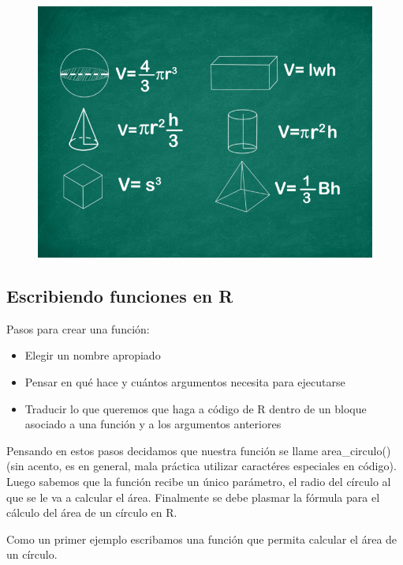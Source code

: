 \documentclass[]{book}
\providecommand{\tightlist}{%
  \setlength{\itemsep}{0pt}\setlength{\parskip}{0pt}}
\theoremstyle{definition}
\theoremstyle{definition}
\theoremstyle{definition}
\theoremstyle{remark}
\begin{document}
\begin{figure}
\centering
\includegraphics{./imagenes/volume.png}
\caption{}
\end{figure}

\subsection{Escribiendo funciones en
R}\label{escribiendo-funciones-en-r}

Pasos para crear una función:

\begin{itemize}
\tightlist
\item
  Elegir un nombre apropiado
\item
  Pensar en qué hace y cuántos argumentos necesita para ejecutarse
\item
  Traducir lo que queremos que haga a código de R dentro de un bloque
  asociado a una función y a los argumentos anteriores
\end{itemize}

Pensando en estos pasos decidamos que nuestra función se llame
area\_circulo() (sin acento, es en general, mala práctica utilizar
caractéres especiales en código). Luego sabemos que la función recibe un
único parámetro, el radio del círculo al que se le va a calcular el
área. Finalmente se debe plasmar la fórmula para el cálculo del área de
un círculo en R.

Como un primer ejemplo escribamos una función que permita calcular el
área de un círculo.
\end{document}
